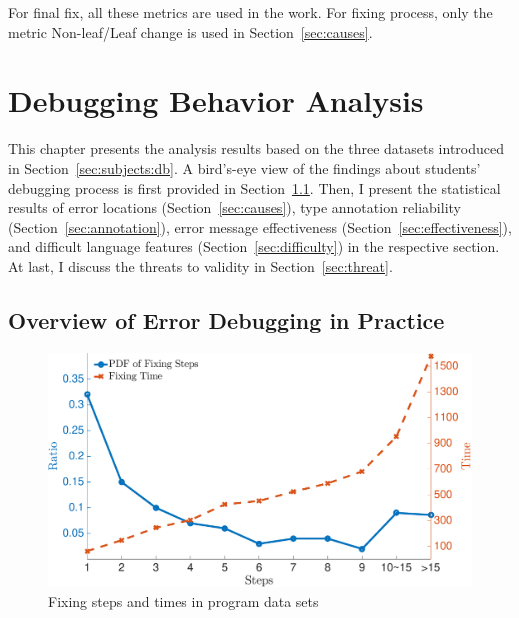 \documentclass[12pt]{report}	%
\begin{document}
\noindent
For final fix, all these metrics are used in the work. For
fixing process, only the metric Non-leaf/Leaf change is used
in Section~\ref{sec:causes}.


\chapter{Debugging Behavior Analysis}
\label{sec:analysis}

This chapter presents the analysis results based on the three datasets introduced in Section~\ref{sec:subjects:db}.
A bird's-eye view of the findings about students' debugging process is first provided in Section~\ref{sec:overview}.
Then, I present the statistical results of error locations (Section~\ref{sec:causes}), type annotation reliability (Section~\ref{sec:annotation}),
error message effectiveness (Section~\ref{sec:effectiveness}), and difficult language features (Section~\ref{sec:difficulty}) in the respective section. 
At last, I discuss the threats to validity in Section~\ref{sec:threat}.

\section{Overview of Error Debugging in Practice}
\label{sec:overview}

\begin{figure}
\centering
\includegraphics[width=.85\columnwidth]{images/step_time.eps}
\caption{Fixing steps and times in program data sets}
\label{fig:fst}
\label{fig:overview:overview}
\end{figure}
\end{document}
